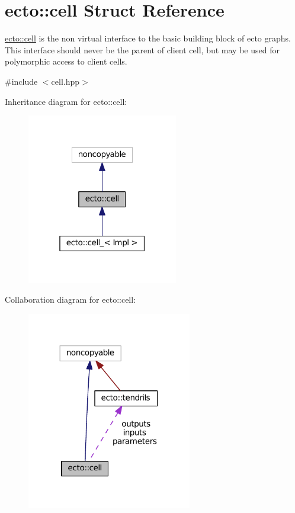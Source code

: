 \hypertarget{structecto_1_1cell}{}\section{ecto\+:\+:cell Struct Reference}
\label{structecto_1_1cell}


\hyperlink{structecto_1_1cell}{ecto\+::cell} is the non virtual interface to the basic building block of ecto graphs. This interface should never be the parent of client cell, but may be used for polymorphic access to client cells.  




{\ttfamily \#include $<$cell.\+hpp$>$}



Inheritance diagram for ecto\+:\+:cell\+:\nopagebreak
\begin{figure}[H]
\begin{center}
\leavevmode
\includegraphics[width=187pt]{structecto_1_1cell__inherit__graph}
\end{center}
\end{figure}


Collaboration diagram for ecto\+:\+:cell\+:\nopagebreak
\begin{figure}[H]
\begin{center}
\leavevmode
\includegraphics[width=204pt]{structecto_1_1cell__coll__graph}
\end{center}
\end{figure}

